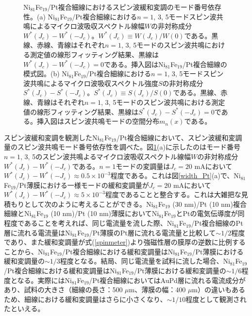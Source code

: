 \begin{figure}[tbp]
 \begin{center}
 \end{center}
 \caption{Ni$_{81}$Fe$_{19}$/Pt複合細線におけるスピン波緩和変調のモード番号依存性。(a) Ni$_{81}$Fe$_{19}$/Pt複合細線における$n=1$, 3, 5モードスピン波共鳴によるマイクロ波吸収スペクトル線幅$W$の非対称成分$W^*(J_c)-W^*(-J_c)$。$W^*(J_c)\equiv W(J_c)/W(0)$である。黒線、赤線、青線はそれぞれ$n=1$, 3, 5モードのスピン波共鳴における測定値の線形フィッティング結果、黒線は$W^*(J_c)-W^*(-J_c)=0$である。挿入図はNi$_{81}$Fe$_{19}$/Pt複合細線の模式図。(b) Ni$_{81}$Fe$_{19}$/Pt複合細線における$n=1$, 3, 5モードスピン波共鳴によるマイクロ波吸収スペクトル強度$S$の非対称成分$S^*(J_c)-S^*(-J_c)$。$S^*(J_c)\equiv S(J_c)/S(0)$である。黒線、赤線、青線はそれぞれ$n=1$, 3, 5モードのスピン波共鳴における測定値の線形フィッティング結果、黒線は$S^*(J_c)-S^*(-J_c)=0$である。挿入図はスピン波共鳴モードの空間分布$m_n(x)$である。}
 \label{spinwave_relax_mode}
\end{figure}



スピン波緩和変調を観測したNi$_{81}$Fe$_{19}$/Pt複合細線において、スピン波緩和変調量のスピン波共鳴モード番号依存性を調べた。図\ref{spinwave_relax_mode}(a)に示したのはモード番号$n=1$, 3, 5のスピン波共鳴よるマイクロ波吸収スペクトル線幅$W$の非対称成分$W^*(J_c)-W^* (-J_c)$である。$n=1$モードの変調量は$J_c=20$ mAにおいて$W^*(J_c)-W^* (-J_c)\approx  0.5\times 10^{-3}$程度である。これは図\ref{width_Pt}(a)で、Ni$_{81}$Fe$_{19}$/Pt薄膜における一様モードの緩和変調量が$J_c=20$ mAにおいて$W^*(J_c)-W^* (-J_c)\approx  5\times 10^{-3}$程度であることと整合する。これは大雑把な見積もりとして次のように考えることができる。Ni$_{81}$Fe$_{19}$ (30 nm)/Pt (10 nm)複合細線とNi$_{81}$Fe$_{19}$ (10 nm)/Pt (10 nm)薄膜においてNi$_{81}$Fe$_{19}$とPtの電気伝導度が同程度であることを考えれば、同じ電流量を流した際、Ni$_{81}$Fe$_{19}$/Pt複合細線のPt層に流れる電流量はNi$_{81}$Fe$_{19}$/Pt薄膜のPt層に流れる電流量と比較して$\sim 1/2$程度であり、また緩和変調量が式(\ref{spinmeter})より強磁性層の膜厚の逆数に比例することから、Ni$_{81}$Fe$_{19}$/Pt複合細線における緩和変調量はNi$_{81}$Fe$_{19}$/Pt薄膜における緩和変調量の$\sim 1/3$程度となる。結局、同じ電流量を試料に流した場合、Ni$_{81}$Fe$_{19}$/Pt複合細線における緩和変調量はNi$_{81}$Fe$_{19}$/Pt薄膜における緩和変調量の$\sim 1/6$程度となる。実際にはNi$_{81}$Fe$_{19}$/Pt複合細線においてはAuPd層に流れる電流成分があり、試料の大きさ（細線の長さ：500 $\mu$m、薄膜の幅：400 $\mu$m）の違いもあるため、細線における緩和変調量はさらに小さくなり、$\sim 1/10$程度として観測されたといえる。

